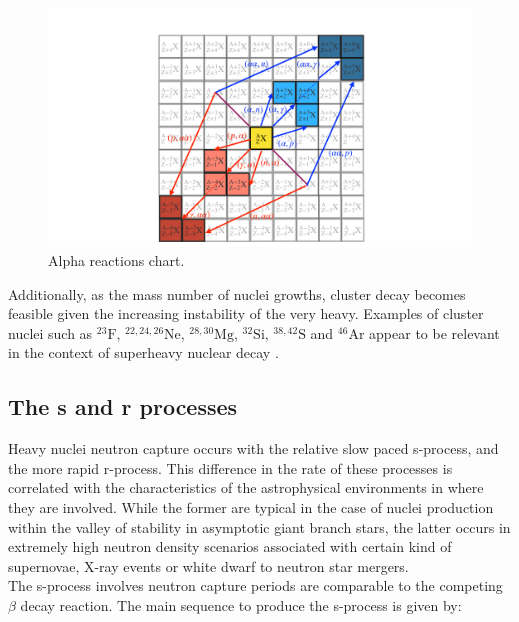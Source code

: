 \documentclass[openany]{book}
\begin{document}
\begin{figure}[H]
	\centering 
	\includegraphics[scale=0.25]{Graphs/alphaChart.pdf}
	\caption[Alpha reactions chart]{Alpha reactions chart. }
	\label{fig:alphaChart}
\end{figure}

Additionally, as the mass number of nuclei growths, cluster decay becomes feasible given the increasing instability of the very heavy. Examples of cluster nuclei such as  $\mathrm{{}^{23}F}$, $\mathrm{{}^{22,24,26}Ne}$, $\mathrm{{}^{28,30}Mg}$, $\mathrm{{}^{32}Si}$, $\mathrm{{}^{38,42}S}$ and $\mathrm{{}^{46}Ar}$ appear to be relevant in the context of superheavy nuclear decay \cite{maroufi_dehghani_alavi_2019}. \\


\subsection{The s and r processes} \label{sub:srProcesses}

Heavy nuclei neutron capture occurs with the relative slow paced s-process, and the more rapid r-process. This difference in the rate of these processes is correlated with the characteristics of the astrophysical environments in where they are involved. While the former are typical in the case of nuclei production within the valley of stability in asymptotic giant branch stars, the latter occurs in extremely high neutron density scenarios associated with certain kind of supernovae, X-ray events or white dwarf to neutron star mergers. \\

The s-process involves neutron capture periods are comparable to the competing $\beta$ decay reaction.  The main sequence to produce the s-process is given by: 
\end{document}
